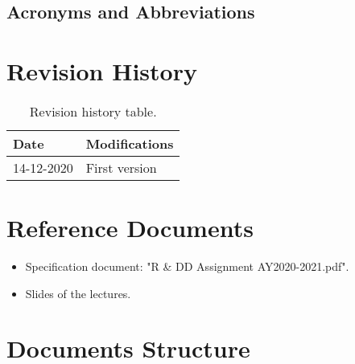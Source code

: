 \subsection{Acronyms and Abbreviations}
\printglossary

\section{Revision History}

\begin{table}[H]
\centering
\begin{tabular}{ m{} | m{} } 
	 \textbf{Date} & \textbf{Modifications} \\
	\hline
	14-12-2020 & First version \\
\end{tabular}
\caption{Revision history table.}
\label{table:revisionHistory}
\end{table}

\section{Reference Documents}

\begin{itemize}
	\item Specification document: "R \& DD Assignment AY2020-2021.pdf".
	\item Slides of the lectures.
\end{itemize}

\section{Documents Structure}

